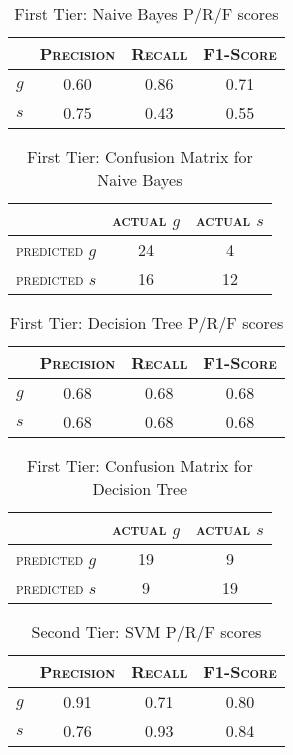 \begin{table}[h]
	\center
	\begin{tabular}{ c | c  c  c }
		& \textsc{Precision} & \textsc{Recall} & \textsc{F1-Score} \\
		\hline
		\textsc{$g$} 	& 0.60 & 0.86 & 0.71 \\
		\textsc{$s$}	& 0.75 & 0.43 & 0.55
	\end{tabular}
	\caption{First Tier: Naive Bayes P/R/F scores}
\end{table}

\begin{table}[h]
	\center
	\begin{tabular}{ c | c  c }
		 & \textsc{actual $g$} & \textsc{actual $s$} \\
		\hline
		\textsc{predicted $g$} 	& 24 & 4 \\
		\textsc{predicted $s$}		& 16 & 12
	\end{tabular}
	\caption{First Tier: Confusion Matrix for Naive Bayes}
\end{table}

\begin{table}[h]
	\center
	\begin{tabular}{ c | c  c  c }
		& \textsc{Precision} & \textsc{Recall} & \textsc{F1-Score} \\
		\hline
		\textsc{$g$} 	& 0.68 & 0.68 & 0.68 \\
		\textsc{$s$}	& 0.68 & 0.68 & 0.68
	\end{tabular}
	\caption{First Tier: Decision Tree P/R/F scores}
\end{table}

\begin{table}[h]
	\center
	\begin{tabular}{ c | c  c }
		 & \textsc{actual $g$} & \textsc{actual $s$} \\
		\hline
		\textsc{predicted $g$} 	& 19 & 9 \\
		\textsc{predicted $s$}		& 9 & 19
	\end{tabular}
	\caption{First Tier: Confusion Matrix for Decision Tree}
\end{table}
\newpage

\begin{table}[h]
	\center
	\begin{tabular}{ c | c  c  c }
		& \textsc{Precision} & \textsc{Recall} & \textsc{F1-Score} \\
		\hline
		\textsc{$g$} 	& 0.91 & 0.71 & 0.80 \\
		\textsc{$s$}	& 0.76 & 0.93 & 0.84
	\end{tabular}
	\caption{Second Tier: SVM P/R/F scores}
\end{table}

